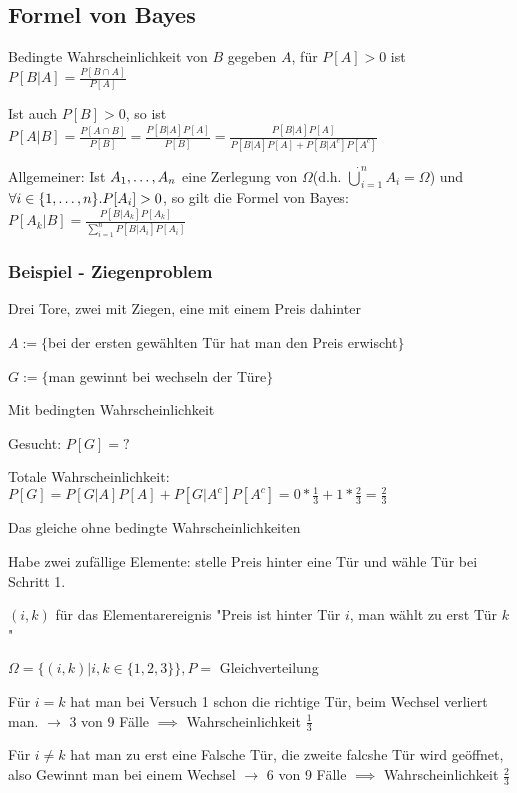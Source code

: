 \subsection{Formel von Bayes}
\enumstart
	\item Bedingte Wahrscheinlichkeit von $B$ gegeben $A$, für $P[A] > 0$ ist $P[B | A] = \frac{P[B \cap A]}{P[A]}$
	\item Ist auch $P[B] > 0$, so ist $P[A | B] = \frac{P[A \cap B]}{P[B]} = \frac{P[B | A]P[A]}{P[B]} = \frac{P[B | A]P[A]}{P[B | A]P[A] + P[B | A^c]P[A^c]}$
	\item Allgemeiner: Ist $A_1, \mathellipsis, A_n$ eine Zerlegung von $\Omega $(d.h. $\dot\bigcup_{i=1}^nA_i = \Omega$) und $\forall i \in \{1, \mathellipsis, n\}.P[A_i] > 0$, so gilt die Formel von Bayes: $P[A_k | B] = \frac{P[B | A_k]P[A_k]}{\sum_{i=1}^nP[B | A_i]P[A_i]}$
\enumend

\subsubsection{Beispiel - Ziegenproblem}
\enumstart
	\item Drei Tore, zwei mit Ziegen, eine mit einem Preis dahinter
	\item $A := \{$bei der ersten gewählten Tür hat man den Preis erwischt$\}
$
	\item $G := \{$man gewinnt bei wechseln der Türe$\}$
	\item Mit bedingten Wahrscheinlichkeit
	\item Gesucht: $P[G] = ?$
	\enumstart
		\item Totale Wahrscheinlichkeit: $P[G] = P[G | A]P[A] + P[G | A^c]P[A^c] = 0*\frac{1}{3} + 1*\frac{2}{3} = \frac{2}{3}$
	\enumend
	\item Das gleiche ohne bedingte Wahrscheinlichkeiten
	\enumstart
		\item Habe zwei zufällige Elemente: stelle Preis hinter eine Tür und wähle Tür bei Schritt 1.
		\item $(i,k)$ für das Elementarereignis "Preis ist hinter Tür $i$, man wählt zu erst Tür $k$"
		\item $\Omega = \{(i,k) | i,k \in \{1,2,3\}\}, P =$ Gleichverteilung
		\item Für $i=k$ hat man bei Versuch 1 schon die richtige Tür, beim Wechsel verliert man. $\rightarrow$ 3 von 9 Fälle $\implies$ Wahrscheinlichkeit $\frac{1}{3}$
		\item Für $i \ne k$ hat man zu erst eine Falsche Tür, die zweite falcshe Tür wird geöffnet, also Gewinnt man bei einem Wechsel $\rightarrow$ 6 von 9 Fälle $\implies$ Wahrscheinlichkeit $\frac{2}{3}$
	\enumend
\enumend

